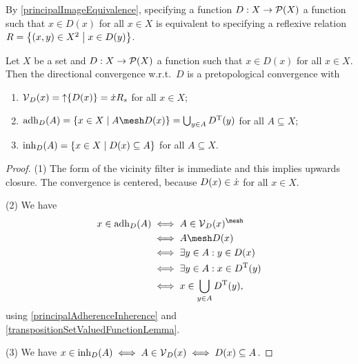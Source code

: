 By \ref{principalImageEquivalence}, specifying a function $D: X\to \operatorname{\mathcal{P}}(X)$ a function such that $x\in D(x)$ for all $x\in X$ is equivalent to specifying a reflexive relation $R = \setbuilder{(x,y)\in X^2}{x\in D(y)}$.

\begin{lemma} \label{directionalConvergenceLemma}
Let $X$ be a set and $D: X\to \operatorname{\mathcal{P}}(X)$ a function such that $x\in D(x)$ for all $x\in X$. Then the directional convergence w.r.t.\ $D$ is a pretopological convergence with
\begin{enumerate}
\item $\operatorname{\mathcal{V}}_D(x) = \operatorname{\uparrow} \{D(x)\} = \dot{x}R_s$ for all $x\in X$;
\item $\adh_D(A) = \setbuilder{x\in X}{A\mesh D(x)} = \bigcup_{y\in A}D^\transp(y)$ for all $A\subseteq X$;
\item $\inh_D(A) = \setbuilder{x\in X}{D(x)\subseteq A}$ for all $A\subseteq X$.
\end{enumerate}
\end{lemma}
\begin{proof}
(1) The form of the vicinity filter is immediate and this implies upwards closure. The convergence is centered, because $D(x)\in \dot{x}$ for all $x\in X$.

(2) We have
\begin{align*}
x\in \adh_D(A) &\iff A\in \vicinity_D(x)^\mesh \\
&\iff A\mesh D(x) \\
&\iff \exists y\in A: y \in D(x) \\
&\iff \exists y\in A: x \in D^\transp(y) \\
&\iff x\in \bigcup_{y\in A}D^\transp(y),
\end{align*}
using \ref{principalAdherenceInherence} and \ref{transpositionSetValuedFunctionLemma}.

(3) We have $x\in \operatorname{inh}_D(A) \iff A\in \operatorname{\mathcal{V}}_D(x) \iff D(x)\subseteq A$.
\end{proof}

